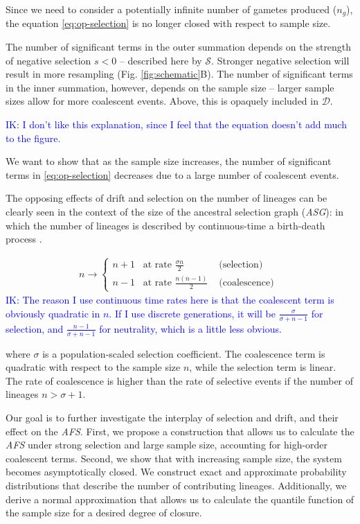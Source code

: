 \documentclass[review]{elsarticle}
\newcommand{\ra}{\rightarrow}
\newcommand{\ikcomment}[1]{\textcolor{blue}{IK: #1}}
\begin{document}
Since we need to consider a potentially infinite number of gametes produced ($n_g$), the equation
\eqref{eq:op-selection} is no longer closed with respect to sample size.

The number of significant terms in the outer summation depends on the strength of negative selection
$s<0$ -- described here by $\mathcal{S}$. Stronger negative selection will result in more resampling
(Fig. \ref{fig:schematic}B). The number of significant terms in the inner summation, however, depends on
the sample size -- larger sample sizes allow for more coalescent events. Above, this is opaquely
included in $\mathcal{D}$.

\ikcomment{I don't like this explanation, since I feel that the equation doesn't add much to the
  figure.}

We want to show that as the sample size increases, the number of significant terms in
\eqref{eq:op-selection} decreases due to a large number of coalescent events.

The opposing effects of drift and selection on the number of lineages can be clearly seen in the
context of the size of the ancestral selection graph (\textit{ASG}): in which the number of lineages
is described by continuous-time a birth-death process \citep{KroneNeuhauser1997, Wakeley2009}.

\begin{align}
  \label{eq:asg-size}
  n \ra \begin{cases}
    n+1 \hspace{10pt} \text{at rate } \frac{\sigma n}{2} & \text{ (selection) }\\
    n-1 \hspace{10pt} \text{at rate } \frac{n(n-1)}{2}   & \text{ (coalescence) }
  \end{cases}
\end{align}
\ikcomment{The reason I use continuous time rates here is that the coalescent term is obviously
  quadratic in $n$. If I use discrete generations, it will be $\frac{\sigma}{\sigma+n-1}$ for
  selection, and $\frac{n-1}{\sigma+n-1}$ for neutrality, which is a little less obvious.}

where $\sigma$ is a population-scaled selection coefficient. The coalescence term is quadratic with
respect to the sample size $n$, while the selection term is linear. The rate of coalescence is
higher than the rate of selective events if the number of lineages $n>\sigma+1$.

Our goal is to further investigate the interplay of selection and drift, and their effect on the
\textit{AFS}. First, we propose a construction that allows us to calculate the \textit{AFS} under
strong selection and large sample size, accounting for high-order coalescent terms. Second, we show
that with increasing sample size, the system becomes asymptotically closed. We construct exact and
approximate probability distributions that describe the number of contributing lineages.
Additionally, we derive a normal approximation that allows us to calculate the quantile function of
the sample size for a desired degree of closure.
\end{document}
